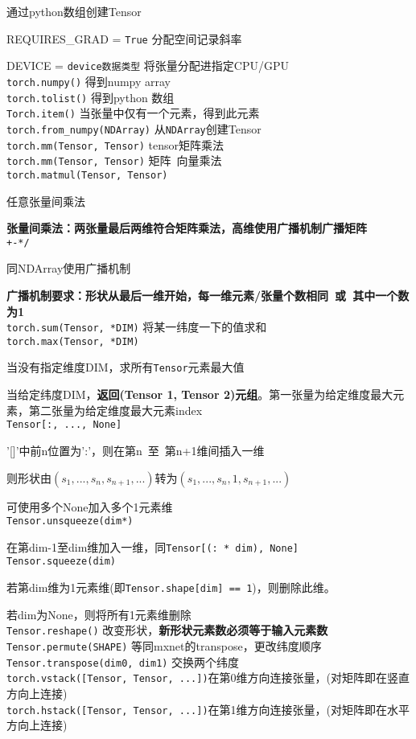 \documentclass[UTF8]{ctexart}
\begin{document}
  通过python数组创建Tensor

  REQUIRES\_GRAD = \texttt{True} 分配空间记录斜率
  
  DEVICE = \texttt{device数据类型} 将张量分配进指定CPU/GPU\\
\texttt{torch.numpy()} 得到numpy array \\
\texttt{torch.tolist()} 得到python 数组 \\
\texttt{Torch.item()} 当张量中仅有一个元素，得到此元素 \\
\texttt{torch.from\_numpy(NDArray)} 从\texttt{NDArray}创建Tensor\\
\texttt{torch.mm(Tensor, Tensor)} tensor矩阵乘法\\
\texttt{torch.mm(Tensor, Tensor)} 矩阵\ 向量乘法\\
\texttt{torch.matmul(Tensor, Tensor)} 

  任意张量间乘法
  
  \textbf{张量间乘法：两张量最后两维符合矩阵乘法，高维使用广播机制广播矩阵}\\
\texttt{+-*/} 

  同NDArray使用广播机制
  
  \textbf{广播机制要求：形状从最后一维开始，每一维元素/张量个数相同\ 或\ 其中一个数为1}\\
\texttt{torch.sum(Tensor, *DIM)} 将某一纬度一下的值求和\\
\texttt{torch.max(Tensor, *DIM)} 

  当没有指定维度DIM，求所有\texttt{Tensor}元素最大值
  
  当给定纬度DIM，\textbf{返回(Tensor 1, Tensor 2)元组}。第一张量为给定维度最大元素，第二张量为给定维度最大元素index\\
\texttt{Tensor[:, ..., None]} 
  
  '[]'中前n位置为':'，则在第n\ 至\ 第n+1维间插入一维

  则形状由$(s_1, ..., s_n, s_{n+1}, ...)$转为$(s_1, ..., s_n, 1, s_{n+1}, ...)$
  
  可使用多个None加入多个1元素维\\
\texttt{Tensor.unsqueeze(dim*)}

  在第dim-1至dim维加入一维，同\texttt{Tensor[(: * dim), None]}\\
\texttt{Tensor.squeeze(dim)}

  若第dim维为1元素维(即\texttt{Tensor.shape[dim] == 1})，则删除此维。

  若dim为None，则将所有1元素维删除\\
\texttt{Tensor.reshape()} 改变形状，\textbf{新形状元素数必须等于输入元素数}\\
\texttt{Tensor.permute(SHAPE)} 等同mxnet的transpose，更改纬度顺序\\
\texttt{Tensor.transpose(dim0, dim1)} 交换两个纬度\\
\texttt{torch.vstack([Tensor, Tensor, ...])}在第0维方向连接张量，(对矩阵即在竖直方向上连接)\\
\texttt{torch.hstack([Tensor, Tensor, ...])}在第1维方向连接张量，(对矩阵即在水平方向上连接)
\end{document}

